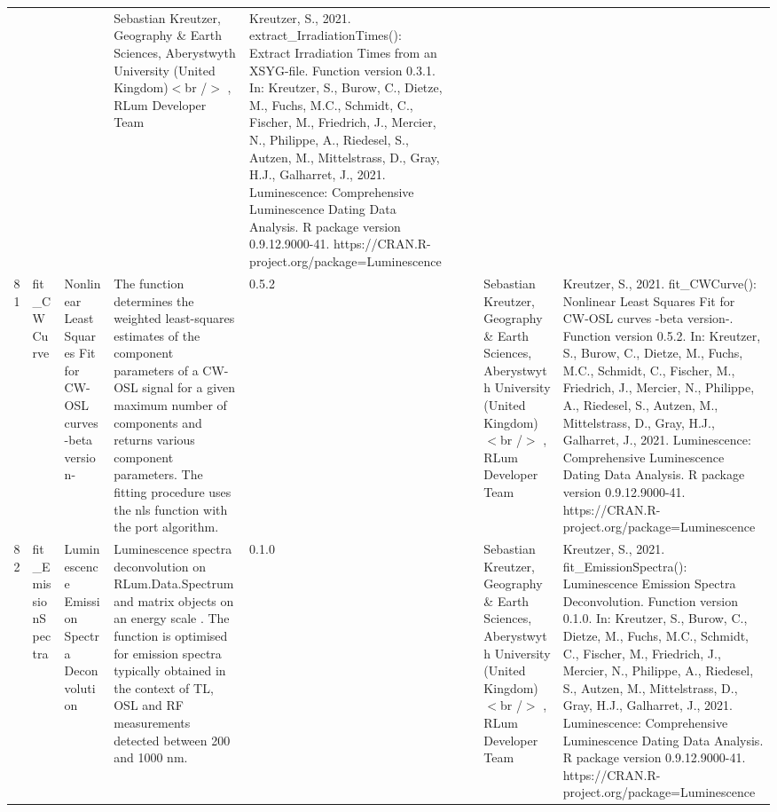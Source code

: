 \begin{table}[ht]
\begin{tabular}{rllllllll}
 &  &  & Sebastian Kreutzer, Geography \& Earth Sciences, Aberystwyth University (United Kingdom)$<$br /$>$ , RLum Developer Team & Kreutzer, S., 2021. extract\_IrradiationTimes(): Extract Irradiation Times from an XSYG-file. Function version 0.3.1. In: Kreutzer, S., Burow, C., Dietze, M., Fuchs, M.C., Schmidt, C., Fischer, M., Friedrich, J., Mercier, N., Philippe, A., Riedesel, S., Autzen, M., Mittelstrass, D., Gray, H.J., Galharret, J., 2021. Luminescence: Comprehensive Luminescence Dating Data Analysis. R package version 0.9.12.9000-41. https://CRAN.R-project.org/package=Luminescence
 \\ 
  81 & fit\_CWCurve & Nonlinear Least Squares Fit for CW-OSL curves -beta version- & The function determines the weighted least-squares estimates of the component parameters of a CW-OSL signal for a given maximum number of components and returns various component parameters. The fitting procedure uses the  nls  function with the  port  algorithm. & 0.5.2
 &  &  & Sebastian Kreutzer, Geography \& Earth Sciences, Aberystwyth University (United Kingdom)$<$br /$>$ , RLum Developer Team & Kreutzer, S., 2021. fit\_CWCurve(): Nonlinear Least Squares Fit for CW-OSL curves -beta version-. Function version 0.5.2. In: Kreutzer, S., Burow, C., Dietze, M., Fuchs, M.C., Schmidt, C., Fischer, M., Friedrich, J., Mercier, N., Philippe, A., Riedesel, S., Autzen, M., Mittelstrass, D., Gray, H.J., Galharret, J., 2021. Luminescence: Comprehensive Luminescence Dating Data Analysis. R package version 0.9.12.9000-41. https://CRAN.R-project.org/package=Luminescence
 \\ 
  82 & fit\_EmissionSpectra & Luminescence Emission Spectra Deconvolution & Luminescence spectra deconvolution on  RLum.Data.Spectrum  and  matrix  objects on an  energy scale . The function is optimised for emission spectra typically obtained in the context of TL, OSL and RF measurements detected between 200 and 1000 nm. & 0.1.0
 &  &  & Sebastian Kreutzer, Geography \& Earth Sciences, Aberystwyth University (United Kingdom)$<$br /$>$ , RLum Developer Team & Kreutzer, S., 2021. fit\_EmissionSpectra(): Luminescence Emission Spectra Deconvolution. Function version 0.1.0. In: Kreutzer, S., Burow, C., Dietze, M., Fuchs, M.C., Schmidt, C., Fischer, M., Friedrich, J., Mercier, N., Philippe, A., Riedesel, S., Autzen, M., Mittelstrass, D., Gray, H.J., Galharret, J., 2021. Luminescence: Comprehensive Luminescence Dating Data Analysis. R package version 0.9.12.9000-41. https://CRAN.R-project.org/package=Luminescence
 \\ 

\end{tabular}
\end{table}
